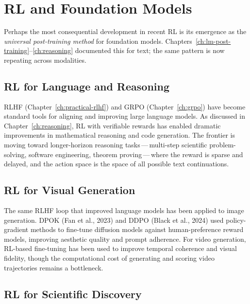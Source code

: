 \section{RL and Foundation Models}
\label{sec:open-foundation}

Perhaps the most consequential development in recent RL is its
emergence as the \emph{universal post-training method} for foundation
models.  Chapters~\ref{ch:lm-post-training}--\ref{ch:reasoning}
documented this for text; the same pattern is now repeating across
modalities.

\subsection{RL for Language and Reasoning}

RLHF (Chapter~\ref{ch:practical-rlhf}) and GRPO (Chapter~\ref{ch:grpo}) have
become standard tools for aligning and improving large language models.
As discussed in Chapter~\ref{ch:reasoning}, RL with verifiable rewards
has enabled dramatic improvements in mathematical reasoning and code
generation.  The frontier is moving toward longer-horizon reasoning
tasks\,---\,multi-step scientific problem-solving, software
engineering, theorem proving\,---\,where the reward is sparse and
delayed, and the action space is the space of all possible text
continuations.

\subsection{RL for Visual Generation}

The same RLHF loop that improved language models has been applied to
image generation.  DPOK (Fan et al., 2023) and DDPO (Black et al.,
2024) used policy-gradient methods to fine-tune diffusion models
against human-preference reward models, improving aesthetic quality and
prompt adherence.  For video generation, RL-based fine-tuning has been
used to improve temporal coherence and visual fidelity, though the
computational cost of generating and scoring video trajectories remains
a bottleneck.

\subsection{RL for Scientific Discovery}

